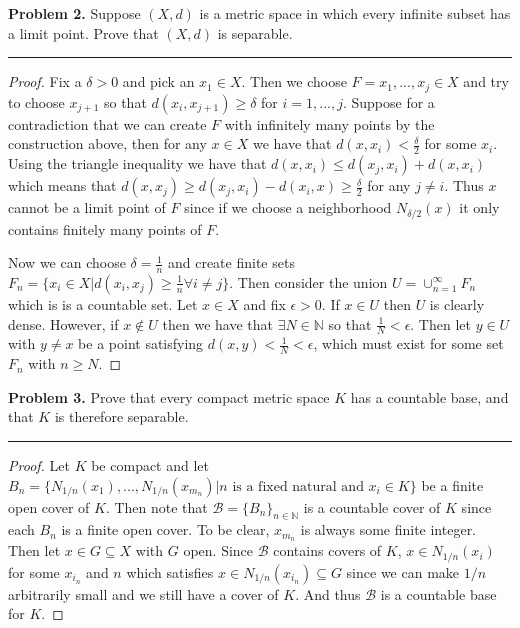 \documentclass[leqno]{article}
\theoremstyle{nonumberplain}
\newtheorem{proof}{Proof}
\begin{document}
\noindent\textbf{Problem 2.} Suppose $(X,d)$ is a metric space in which every infinite subset has a limit point.  Prove that $(X,d)$ is separable.

\noindent\rule[0.5ex]{\linewidth}{1pt}

\begin{proof}
Fix a $\delta >0$ and pick an $x_1\in X$. Then we choose $F=x_1,...,x_j\in X$ and try to choose $x_{j+1}$ so that $d(x_i,x_{j+1})\geq \delta$ for $i=1,...,j$. Suppose for a contradiction that we can create $F$ with infinitely many points by the construction above, then for any $x\in X$ we have that $d(x,x_i)<\frac{\delta}{2}$ for some $x_i$. Using the triangle inequality we have that $d(x,x_i)\leq d(x_j,x_i)+d(x,x_i)$ which means that $d(x,x_j)\geq d(x_j,x_i)-d(x_i,x)\geq \frac{\delta}{2}$ for any $j\neq i$. Thus $x$ cannot be a limit point of $F$ since if we choose a neighborhood $N_{\delta/2}(x)$ it only contains finitely many points of $F$.

Now we can choose $\delta=\frac{1}{n}$ and create finite sets $F_n=\{x_i \in X \vert d(x_i,x_j)\geq \frac{1}{n} \forall i\neq j\}$.  Then consider the union $U=\cup_{n=1}^\infty F_n$ which is is a countable set.  Let $x\in X$ and fix $\epsilon >0$.  If $x\in U$ then $U$ is clearly dense.  However, if $x\notin U$ then we have that $\exists N\in \mathbb{N}$ so that $\frac{1}{N}<\epsilon$. Then let $y\in U$ with $y\neq x$ be a point satisfying $d(x,y)<\frac{1}{N}<\epsilon$, which must exist for some set $F_n$ with $n\geq N$.  
\end{proof}


\pagebreak




\noindent\textbf{Problem 3.} Prove that every compact metric space $K$ has a countable base, and that $K$ is therefore separable.

\noindent\rule[0.5ex]{\linewidth}{1pt}

\begin{proof}
Let $K$ be compact and let $B_n=\{N_{1/n}(x_1),...,N_{1/n}(x_{m_n}) \vert n \textrm{ is a fixed natural and } x_i\in K\}$ be a finite open cover of $K$. Then note that $\mathcal{B}=\{B_n\}_{n\in \mathbb{N}}$ is a countable cover of $K$ since each $B_n$ is a finite open cover. To be clear, $x_{m_n}$ is always some finite integer.  Then let $x\in G \subseteq X$ with $G$ open. Since $\mathcal{B}$ contains covers of $K$, $x\in N_{1/n}(x_i)$ for some $x_{i_n}$ and $n$ which satisfies $x\in N_{1/n}(x_{i_n})\subseteq G$ since we can make $1/n$ arbitrarily small and we still have a cover of $K$.  And thus $\mathcal{B}$ is a countable base for $K$.
\end{proof}
\end{document}
